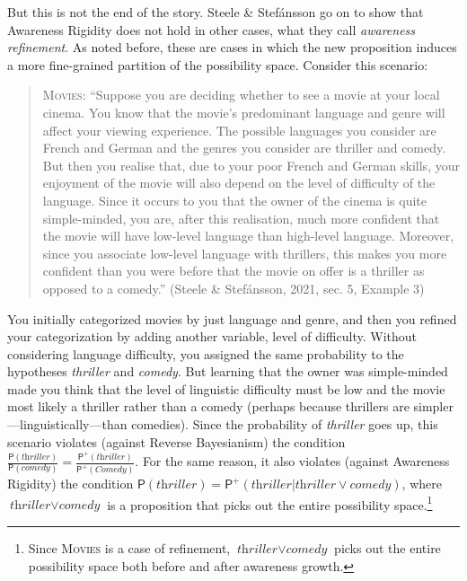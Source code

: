 \documentclass[
  11pt,
  dvipsnames,enabledeprecatedfontcommands]{scrartcl}
\newcommand{\pr}[1]{\ensuremath{\mathsf{P}(#1)}}
\newcommand{\ppr}[2]{\ensuremath{\mathsf{P}^{#1}(#2)}}
\begin{document}
But this is not the end of the story. Steele \& Stefánsson go on to show
that Awareness Rigidity does not hold in other cases, what they call
\emph{awareness refinement}. As noted before, these are cases in which
the new proposition induces a more fine-grained partition of the
possibility space. Consider this scenario:

\begin{quote}
\textsc{Movies}: ``Suppose you are deciding whether to see a movie at
your local cinema. You know that the movie's predominant language and
genre will affect your viewing experience. The possible languages you
consider are French and German and the genres you consider are thriller
and comedy. But then you realise that, due to your poor French and
German skills, your enjoyment of the movie will also depend on the level
of difficulty of the language. Since it occurs to you that the owner of
the cinema is quite simple-minded, you are, after this realisation, much
more confident that the movie will have low-level language than
high-level language. Moreover, since you associate low-level language
with thrillers, this makes you more confident than you were before that
the movie on offer is a thriller as opposed to a comedy.'' (Steele \&
Stefánsson, 2021, sec. 5, Example 3)
\end{quote}

\doublespace

\noindent You initially categorized movies by just language and genre,
and then you refined your categorization by adding another variable,
level of difficulty. Without considering language difficulty, you
assigned the same probability to the hypotheses \textit{thriller} and
\textit{comedy}. But learning that the owner was simple-minded made you
think that the level of linguistic difficulty must be low and the movie
most likely a thriller rather than a comedy (perhaps because thrillers
are simpler---linguistically---than comedies). Since the probability of
\textit{thriller} goes up, this scenario violates (against Reverse
Bayesianism) the condition
\(\frac{\pr{\textit{thriller}}}{\pr{\textit{comedy}}}=\frac{\ppr{+}{\textit{thriller}}}{\ppr{+}{\textit{Comedy}}}\).
For the same reason, it also violates (against Awareness Rigidity) the
condition
\(\pr{\textit{thriller}}=\ppr{+}{\textit{thriller} \vert \textit{thriller}\vee \textit{comedy}}\),
where \(\textit{thriller}\vee \textit{comedy}\) is a proposition that
picks out the entire possibility space.\footnote{Since \textsc{Movies}
  is a case of refinement, \(\textit{thriller}\vee \textit{comedy}\)
  picks out the entire possibility space both before and after awareness
  growth.}
\end{document}

